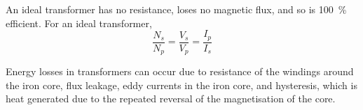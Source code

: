 \documentclass[Physics.tex]{subfiles}
\begin{document}
An ideal transformer has no resistance, loses no magnetic flux, and so is \SI{100}{\percent} efficient. For an ideal transformer, \begin{equation}\frac{N_s}{N_p} = \frac{V_s}{V_p} = \frac{I_p}{I_s}\end{equation}

Energy losses in transformers can occur due to resistance of the windings around the iron core, flux leakage, eddy currents in the iron core, and hysteresis, which is heat generated due to the repeated reversal of the magnetisation of the core.
\end{document}
